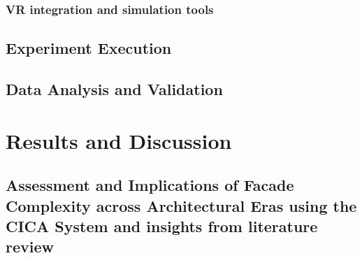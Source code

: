 \begin{linenumbers}
\subsubsection{VR integration and simulation tools}
\label{subsubsec:VR_integration}


\subsection{Experiment Execution}
\label{subsec:Experiment_execution}





\subsection{Data Analysis and Validation}
\label{subsec:Data_analysis}





\section{Results and Discussion}
\label{sec:Results}




\subsection{Assessment and Implications of Facade Complexity across Architectural Eras using the CICA System and insights from literature review}
\label{subsec:ResultsComplexityImageAnalysishistory}



\end{linenumbers}
